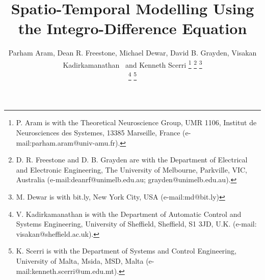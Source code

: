 \documentclass[draftcls,onecolumn]{IEEEtran}
\begin{document}
%
\title{Spatio-Temporal Modelling Using the Integro-Difference Equation}
%
%
%

\author{Parham Aram, Dean R. Freestone, 
        Michael Dewar, David B. Grayden, Visakan Kadirkamanathan~ and Kenneth Scerri  %
\thanks{P. Aram is with the Theoretical Neuroscience Group, UMR 1106, Institut de Neurosciences des Systemes, 13385 Marseille, France (e-mail:parham.aram@univ-amu.fr).}%
\thanks{D. R. Freestone and D. B. Grayden are with the Department of Electrical and Electronic Engineering, The University of Melbourne,
Parkville, VIC, Australia (e-mail:deanrf@unimelb.edu.au; grayden@unimelb.edu.au).}
\thanks{M. Dewar is with bit.ly, New York City, USA (e-mail:md@bit.ly)}  

\thanks{V. Kadirkamanathan is with the Department of Automatic Control and Systems Engineering, University of Sheffield, Sheffield, S1 3JD, U.K. (e-mail: visakan@sheffield.ac.uk).}
\thanks{K. Scerri is with the Department of Systems and Control Engineering, University of Malta, Msida, MSD, Malta (e-mail:kenneth.scerri@um.edu.mt).}}



% 
%
\end{document}
